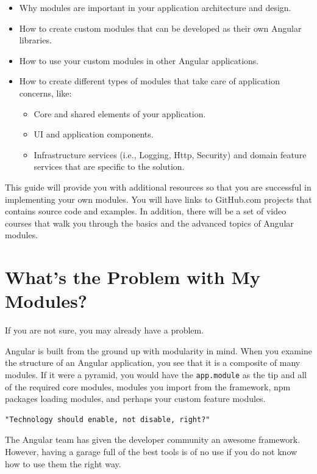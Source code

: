 \documentclass[]{book}
\providecommand{\tightlist}{%
  \setlength{\itemsep}{0pt}\setlength{\parskip}{0pt}}
\theoremstyle{definition}
\theoremstyle{definition}
\theoremstyle{definition}
\theoremstyle{remark}
\begin{document}
\begin{itemize}
\tightlist
\item
  Why modules are important in your application architecture and design.
\item
  How to create custom modules that can be developed as their own
  Angular libraries.
\item
  How to use your custom modules in other Angular applications.
\item
  How to create different types of modules that take care of application
  concerns, like:

  \begin{itemize}
  \tightlist
  \item
    Core and shared elements of your application.
  \item
    UI and application components.
  \item
    Infrastructure services (i.e., Logging, Http, Security) and domain
    feature services that are specific to the solution.
  \end{itemize}
\end{itemize}

This guide will provide you with additional resources so that you are
successful in implementing your own modules. You will have links to
GitHub.com projects that contains source code and examples. In addition,
there will be a set of video courses that walk you through the basics
and the advanced topics of Angular modules.

\chapter{What's the Problem with My
Modules?}\label{whats-the-problem-with-my-modules}

If you are not sure, you may already have a problem.

Angular is built from the ground up with modularity in mind. When you
examine the structure of an Angular application, you see that it is a
composite of many modules. If it were a pyramid, you would have the
\texttt{app.module} as the tip and all of the required core modules,
modules you import from the framework, npm packages loading modules, and
perhaps your custom feature modules.

\begin{verbatim}
"Technology should enable, not disable, right?"
\end{verbatim}

The Angular team has given the developer community an awesome framework.
However, having a garage full of the best tools is of no use if you do
not know how to use them the right way.
\end{document}
